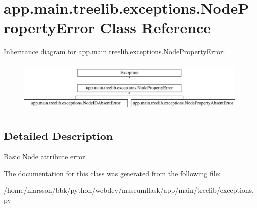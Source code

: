 \hypertarget{classapp_1_1main_1_1treelib_1_1exceptions_1_1NodePropertyError}{}\section{app.\+main.\+treelib.\+exceptions.\+Node\+Property\+Error Class Reference}
\label{classapp_1_1main_1_1treelib_1_1exceptions_1_1NodePropertyError}
Inheritance diagram for app.\+main.\+treelib.\+exceptions.\+Node\+Property\+Error\+:\begin{figure}[H]
\begin{center}
\leavevmode
\includegraphics[height=2.576687cm]{classapp_1_1main_1_1treelib_1_1exceptions_1_1NodePropertyError}
\end{center}
\end{figure}


\subsection{Detailed Description}
\begin{DoxyVerb}Basic Node attribute error\end{DoxyVerb}
 

The documentation for this class was generated from the following file\+:\begin{DoxyCompactItemize}
\item 
/home/nlarsson/bbk/python/webdev/museumflask/app/main/treelib/exceptions.\+py\end{DoxyCompactItemize}
